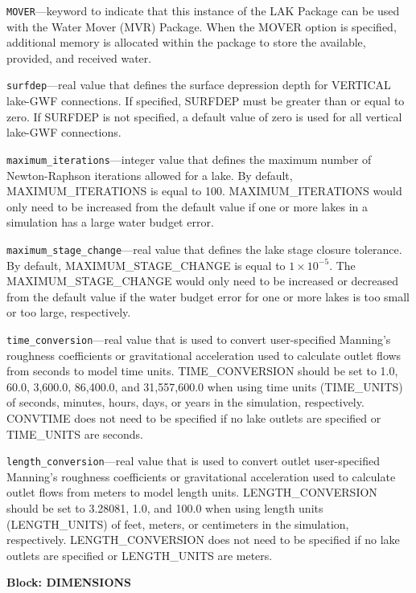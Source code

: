 \begin{description}
\item \texttt{MOVER}---keyword to indicate that this instance of the LAK Package can be used with the Water Mover (MVR) Package.  When the MOVER option is specified, additional memory is allocated within the package to store the available, provided, and received water.

\item \texttt{surfdep}---real value that defines the surface depression depth for VERTICAL lake-GWF connections. If specified, SURFDEP must be greater than or equal to zero. If SURFDEP is not specified, a default value of zero is used for all vertical lake-GWF connections.

\item \texttt{maximum\_iterations}---integer value that defines the maximum number of Newton-Raphson iterations allowed for a lake. By default, MAXIMUM\_ITERATIONS is equal to 100. MAXIMUM\_ITERATIONS would only need to be increased from the default value if one or more lakes in a simulation has a large water budget error.

\item \texttt{maximum\_stage\_change}---real value that defines the lake stage closure tolerance. By default, MAXIMUM\_STAGE\_CHANGE is equal to $1 \times 10^{-5}$. The MAXIMUM\_STAGE\_CHANGE would only need to be increased or decreased from the default value if the water budget error for one or more lakes is too small or too large, respectively.

\item \texttt{time\_conversion}---real value that is used to convert user-specified Manning's roughness coefficients or gravitational acceleration used to calculate outlet flows from seconds to model time units. TIME\_CONVERSION should be set to 1.0, 60.0, 3,600.0, 86,400.0, and 31,557,600.0 when using time units (TIME\_UNITS) of seconds, minutes, hours, days, or years in the simulation, respectively. CONVTIME does not need to be specified if no lake outlets are specified or TIME\_UNITS are seconds.

\item \texttt{length\_conversion}---real value that is used to convert outlet user-specified Manning's roughness coefficients or gravitational acceleration used to calculate outlet flows from meters to model length units. LENGTH\_CONVERSION should be set to 3.28081, 1.0, and 100.0 when using length units (LENGTH\_UNITS) of feet, meters, or centimeters in the simulation, respectively. LENGTH\_CONVERSION does not need to be specified if no lake outlets are specified or LENGTH\_UNITS are meters.

\end{description}
\item \textbf{Block: DIMENSIONS}

